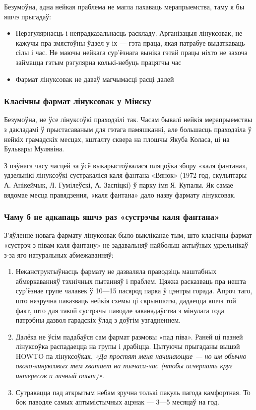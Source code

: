 \documentclass[10pt, a5paper]{article}
\begin{document}
Безумоўна, адна нейкая праблема не магла пахаваць мерапрыемства, таму я бы яшчэ прыгадаў:
\begin{itemize}
  \item Нерэгулярнасць і непрадказальнасць раскладу. Арганізацыя лінуксовак, не кажучы пра змястоўны ўдзел у іх — гэта праца, якая патрабуе выдаткаваць сілы і час. Не маючы нейкага сур'ёзнага выніка гэтай працы ніхто не захоча займацца гэтым рэгулярна колькі-небуць працягчы час
  \item Фармат лінуксовак не даваў магчымасці расці далей
\end{itemize}

\subsubsection*{Класічны фармат лінуксовак у Мінску}

Безумоўна, не ўсе лінуксоўкі праходзілі так. Часам бывалі нейкія мерапрыемствы з дакладамі ў прыстасаваным для гэтага памяшканні, але большасць праходзіла ў нейкіх грамадскіх месцах, кшталту сквера на плошчы Якуба Коласа, ці на Бульвары Мулявіна.

З пэўнага часу часцей за ўсё выкарыстоўвалася пляцоўка збору «каля фантана», удзельнікі лінуксоўкі сустракаліся каля фантана «Вянок» (1972 год, скульптары А. Анікейчык, Л. Гумілеўскі, А. Заспіцкі) ў парку імя Я. Купалы. Як самае вядомае месца правядзення, «каля фантана» дало назву фармату лінуксовак.

\subsubsection*{Чаму б не адкапаць яшчэ раз «сустрэчы каля фантана»}

З'яўленне новага фармату лінуксовак было выкліканае тым, што класічны фармат «сустрэч з півам каля фантану» не задавальняў найбольш актыўных удзельнікаў з-за яго натуральных абмежаванняў:
\begin{enumerate}
  \item Неканструктыўнасць фармату не дазваляла праводзіць маштабных абмеркаванняў тэхнічных пытанняў і праблем. Цяжка расказваць пра нешта сур'ёзнае групе чалавек ў 10—15 пасярод парка ў цэнтры горада. Апроч таго, што нязручна паказваць нейкія схемы ці скрыншоты, дадаецца яшчэ той факт, што для такой сустрэчы паводле заканадаўства з мінулага года патрэбны дазвол гарадскіх ўлад з доўгім узгадненнем.
  \item Далёка не ўсім падабаўся сам фармат размовы «пад піва». Раней ці пазней лінуксоўка распадаецца на групы і драбіцца. Цытуючы прыгаданы вышэй HOWTO па лінуксоўках, \textit{«Да простят меня начинающие — но им обычно около-линуксовых тем хватает на полчаса-час (чтобы исчерпать круг интересов и личный опыт)».}
  \item Сутракацца пад аткрытым небам зручна толькі пакуль пагода камфортная. То бок паводле самых аптымістычных ацэнак — 3—5 месяцаў на год.
\end{enumerate}
\end{document}
